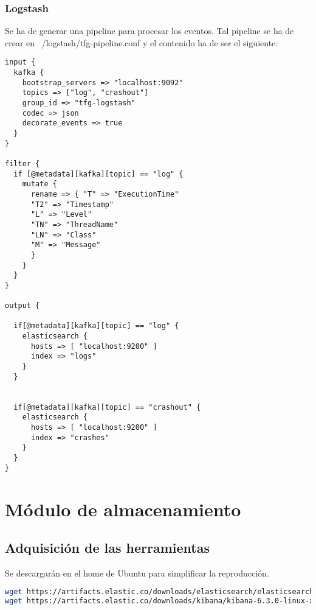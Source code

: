 \subsubsection{Logstash}
Se ha de generar una pipeline para procesar los eventos. Tal pipeline se ha de crear en ~/logstash/tfg-pipeline.conf y el contenido ha de ser el siguiente:

\begin{lstlisting}
input {
  kafka {
    bootstrap_servers => "localhost:9092"
    topics => ["log", "crashout"]
    group_id => "tfg-logstash"
    codec => json
    decorate_events => true
  }
}

filter {
  if [@metadata][kafka][topic] == "log" {
    mutate {
      rename => { "T" => "ExecutionTime"
      "T2" => "Timestamp"
      "L" => "Level"
      "TN" => "ThreadName"
      "LN" => "Class"
      "M" => "Message"
      }
    }
  }
}

output {

  if[@metadata][kafka][topic] == "log" {
    elasticsearch {
      hosts => [ "localhost:9200" ]
      index => "logs"
    }
  }


  if[@metadata][kafka][topic] == "crashout" {
    elasticsearch {
      hosts => [ "localhost:9200" ]
      index => "crashes"
    }
  }
}
\end{lstlisting}


\section{Módulo de almacenamiento}
\subsection{Adquisición de las herramientas}
Se descargarán en el home de Ubuntu para simplificar la reproducción.
\begin{lstlisting}[language=Bash]
wget https://artifacts.elastic.co/downloads/elasticsearch/elasticsearch-6.3.0.tar.gz
wget https://artifacts.elastic.co/downloads/kibana/kibana-6.3.0-linux-x86_64.tar.gz
\end{lstlisting}

